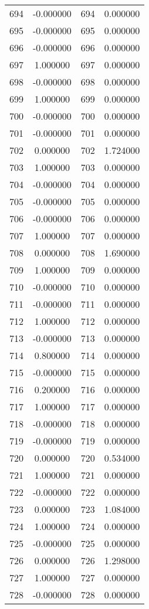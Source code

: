 \documentclass[12pt]{article}
\begin{document}
\begin{longtable}{@{}cccc@{}}
694 & -0.000000 & 694 & 0.000000 \\
695 & -0.000000 & 695 & 0.000000 \\
696 & -0.000000 & 696 & 0.000000 \\
697 & 1.000000 & 697 & 0.000000 \\
698 & -0.000000 & 698 & 0.000000 \\
699 & 1.000000 & 699 & 0.000000 \\
700 & -0.000000 & 700 & 0.000000 \\
701 & -0.000000 & 701 & 0.000000 \\
702 & 0.000000 & 702 & 1.724000 \\
703 & 1.000000 & 703 & 0.000000 \\
704 & -0.000000 & 704 & 0.000000 \\
705 & -0.000000 & 705 & 0.000000 \\
706 & -0.000000 & 706 & 0.000000 \\
707 & 1.000000 & 707 & 0.000000 \\
708 & 0.000000 & 708 & 1.690000 \\
709 & 1.000000 & 709 & 0.000000 \\
710 & -0.000000 & 710 & 0.000000 \\
711 & -0.000000 & 711 & 0.000000 \\
712 & 1.000000 & 712 & 0.000000 \\
713 & -0.000000 & 713 & 0.000000 \\
714 & 0.800000 & 714 & 0.000000 \\
715 & -0.000000 & 715 & 0.000000 \\
716 & 0.200000 & 716 & 0.000000 \\
717 & 1.000000 & 717 & 0.000000 \\
718 & -0.000000 & 718 & 0.000000 \\
719 & -0.000000 & 719 & 0.000000 \\
720 & 0.000000 & 720 & 0.534000 \\
721 & 1.000000 & 721 & 0.000000 \\
722 & -0.000000 & 722 & 0.000000 \\
723 & 0.000000 & 723 & 1.084000 \\
724 & 1.000000 & 724 & 0.000000 \\
725 & -0.000000 & 725 & 0.000000 \\
726 & 0.000000 & 726 & 1.298000 \\
727 & 1.000000 & 727 & 0.000000 \\
728 & -0.000000 & 728 & 0.000000 \\

\end{longtable}
\end{document}
